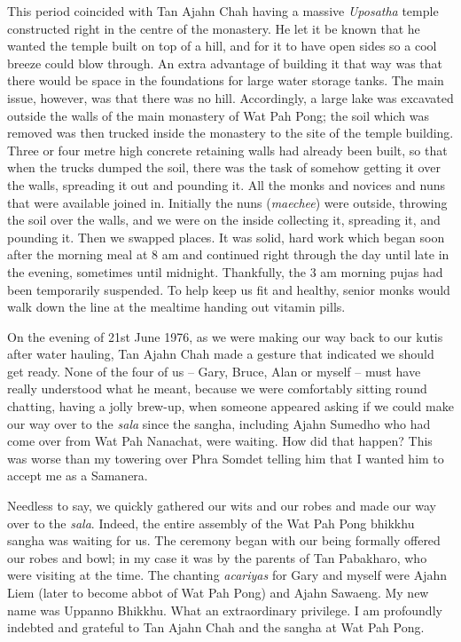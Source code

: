 This period coincided with Tan Ajahn Chah having a massive
\emph{Uposatha} temple constructed right in the centre of the monastery.
He let it be known that he wanted the temple built on top of a hill, and
for it to have open sides so a cool breeze could blow through. An extra
advantage of building it that way was that there would be space in the
foundations for large water storage tanks. The main issue, however, was
that there was no hill. Accordingly, a large lake was excavated outside
the walls of the main monastery of Wat Pah Pong; the soil which was
removed was then trucked inside the monastery to the site of the temple
building. Three or four metre high concrete retaining walls had already
been built, so that when the trucks dumped the soil, there was the task
of somehow getting it over the walls, spreading it out and pounding it.
All the monks and novices and nuns that were available joined in.
Initially the nuns (\emph{maechee}) were outside, throwing the soil over
the walls, and we were on the inside collecting it, spreading it, and
pounding it. Then we swapped places. It was solid, hard work which began
soon after the morning meal at 8 am and continued right through the day
until late in the evening, sometimes until midnight. Thankfully, the 3
am morning pujas had been temporarily suspended. To help keep us fit and
healthy, senior monks would walk down the line at the mealtime handing
out vitamin pills.

On the evening of 21st June 1976, as we were making our way back to our
kutis after water hauling, Tan Ajahn Chah made a gesture that indicated
we should get ready. None of the four of us -- Gary, Bruce, Alan or
myself -- must have really understood what he meant, because we were
comfortably sitting round chatting, having a jolly brew-up, when someone
appeared asking if we could make our way over to the \emph{sala} since
the sangha, including Ajahn Sumedho who had come over from Wat Pah
Nanachat, were waiting. How did that happen? This was worse than my
towering over Phra Somdet telling him that I wanted him to accept me as
a Samanera.

Needless to say, we quickly gathered our wits and our robes and made our
way over to the \emph{sala}. Indeed, the entire assembly of the Wat Pah
Pong bhikkhu sangha was waiting for us. The ceremony began with our being
formally offered our robes and bowl; in my case it was by the parents of
Tan Pabakharo, who were visiting at the time. The chanting
\emph{acariyas} for Gary and myself were Ajahn Liem (later to become
abbot of Wat Pah Pong) and Ajahn Sawaeng. My new name was Uppanno
Bhikkhu. What an extraordinary privilege. I am profoundly indebted and
grateful to Tan Ajahn Chah and the sangha at Wat Pah Pong.

